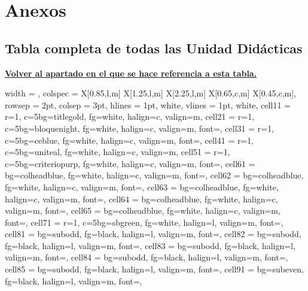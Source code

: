 \documentclass[a4paper,12pt]{article}
\begin{document}
\section{Anexos}

\hypertarget{tablauds}{\subsection{Tabla completa de todas las Unidad Didácticas}}

\noindent\hyperlink{back341}{\textbf{Volver al apartado en el que se hace referencia a esta tabla.}}

\noindent
\begin{longtblr}{
  width      = \textwidth,
  colspec    = {X[0.85,l,m] X[1.25,l,m] X[2.25,l,m] X[0.65,c,m] X[0.45,c,m]},
  rowsep     = 2pt,
  colsep     = 3pt,
  hlines     = {1pt, white},
  vlines     = {1pt, white},
  cell{1}{1} = {r=1, c=5}{bg=titlegold, fg=white, halign=c, valign=m},
  cell{2}{1} = {r=1, c=5}{bg=bloquenight, fg=white, halign=c, valign=m, font=\bfseries},
  cell{3}{1} = {r=1, c=5}{bg=ceblue, fg=white, halign=c, valign=m, font=\small\bfseries},
  cell{4}{1} = {r=1, c=5}{bg=uniteal, fg=white, halign=c, valign=m},
  cell{5}{1} = {r=1, c=5}{bg=criteriopurp, fg=white, halign=c, valign=m, font=\small\bfseries},
  cell{6}{1} = {bg=colheadblue, fg=white, halign=c, valign=m, font=\bfseries},
  cell{6}{2} = {bg=colheadblue, fg=white, halign=c, valign=m, font=\bfseries},
  cell{6}{3} = {bg=colheadblue, fg=white, halign=c, valign=m, font=\bfseries},
  cell{6}{4} = {bg=colheadblue, fg=white, halign=c, valign=m, font=\bfseries},
  cell{6}{5} = {bg=colheadblue, fg=white, halign=c, valign=m, font=\bfseries},
  cell{7}{1} = {r=1, c=5}{bg=sbgreen, fg=white, halign=l, valign=m, font=\small\bfseries},
  cell{8}{1}  = {bg=subodd,  fg=black, halign=l, valign=m, font=\footnotesize},
  cell{8}{2}  = {bg=subodd,  fg=black, halign=l, valign=m, font=\footnotesize},
  cell{8}{3}  = {bg=subodd,  fg=black, halign=l, valign=m, font=\footnotesize},
  cell{8}{4}  = {bg=subodd,  fg=black, halign=l, valign=m, font=\footnotesize},
  cell{8}{5}  = {bg=subodd,  fg=black, halign=l, valign=m, font=\footnotesize},
  cell{9}{1}  = {bg=subeven, fg=black, halign=l, valign=m, font=\footnotesize},
}
\end{longtblr}
\end{document}

